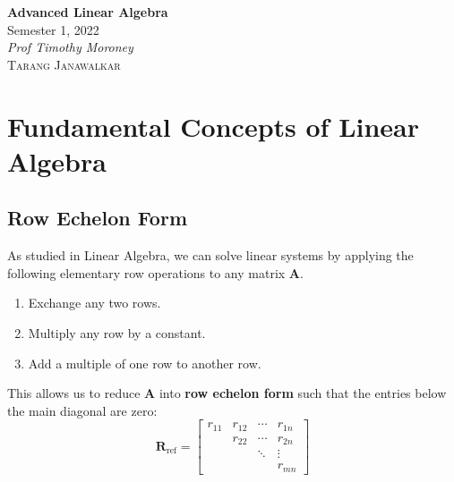 \documentclass{article}
\date{}
\newcommand{\unitName}{Advanced Linear Algebra}
\newcommand{\unitTime}{Semester 1, 2022}
\newcommand{\unitCoordinator}{Prof Timothy Moroney}
\newcommand{\documentAuthors}{\textsc{Tarang Janawalkar}}
\begin{document}
%
\begin{titlepage}
    \vspace*{\fill}
    \begin{center}
        \LARGE{\textbf{\unitName}} \\[0.1in]
        \normalsize{\unitTime} \\[0.2in]
        \normalsize\textit{\unitCoordinator} \\[0.2in]
        \documentAuthors
    \end{center}
    \vspace*{\fill}
    \doclicenseThis
    \thispagestyle{empty}
\end{titlepage}
\newpage
%
\tableofcontents
\newpage
%
\section{Fundamental Concepts of Linear Algebra}
\subsection{Row Echelon Form}
As studied in Linear Algebra, we can solve linear systems by
applying the following elementary row operations to any matrix \(\symbf{A}\).
\begin{enumerate}[label=Type \Roman*.]
    \item Exchange any two rows.
    \item Multiply any row by a constant.
    \item Add a multiple of one row to another row.
\end{enumerate}
This allows us to reduce \(\symbf{A}\) into \textbf{row echelon form}
such that the entries below the main diagonal are zero:
\begin{equation*}
    \symbf{R}_{\mathrm{ref}} =
    \begin{bmatrix}
        r_{11} & r_{12} & \cdots & r_{1n} \\
               & r_{22} & \cdots & r_{2n} \\
               &        & \ddots & \vdots \\
               &        &        & r_{mn}
    \end{bmatrix}
\end{equation*}
\end{document}
